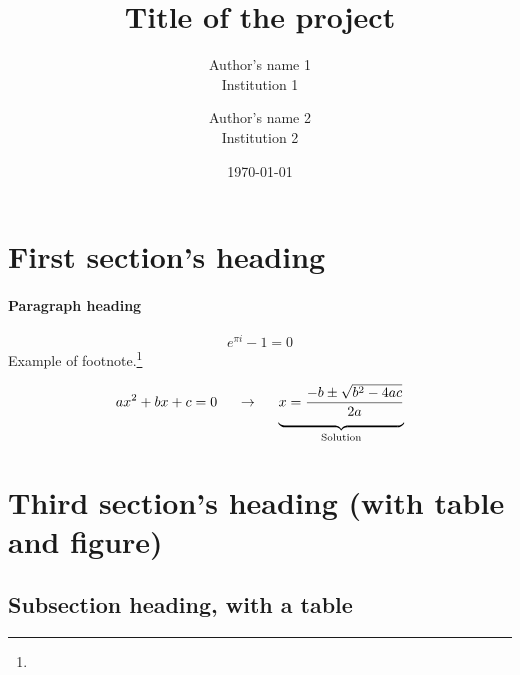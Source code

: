 \documentclass[12pt,green,palatino]{../bppaper}
\title{Title of the project}
\author{Author's name 1\\Institution 1 \and Author's name 2\\Institution 2}
\date{\today}
\begin{document}
\maketitle 


\section{First section's heading}

\blindtext

\paragraph{Paragraph heading}
\blindtext
$$e^{\pi i} - 1 = 0$$
\blindtext Example of footnote.\footnote{\blindtext}
\begin{equation}
    ax^2 +b x + c = 0 \so \llave{x = \dfrac{-b \pm \sqrt{b^2 - 4ac}}{2a}}{Solution}
\end{equation}

\section{Third section's heading (with table and figure)}

\blindtext

\subsection{Subsection heading, with a table}
\end{document}
